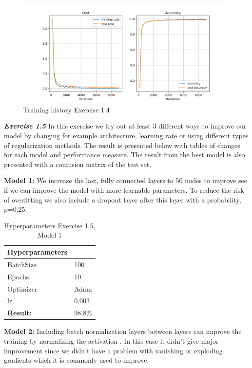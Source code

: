 \documentclass[a4paper,10pt]{article}
\begin{document}
\newpage

\begin{figure}[ht!]
\centering
\includegraphics[width=120mm]{figures/assignment_3/convnet_adam.png}
\caption{Training history Exercise 1.4}
\label{fig:convnetadam}
\end{figure}


\textit{\textbf{Exercise 1.5}} In this exercise we try out at least 3 different ways to improve our model by changing for example architecture, learning rate or using different types of regularization methods. The result is presented below with tables of changes for each model and performance measure. The result from the best model is also presented with a confusion matrix of the test set. 

\textbf{Model 1:} We increase the last, fully connected layers to 50 nodes to improve see if we can improve the model with more learnable parameters. To reduce the risk of overfitting we also include a dropout layer after this layer with a probability, p=0,25. 
\begin{table}[ht!]
\centering
\begin{tabular}{ll}\hline
 \textbf{Hyperparameters}&    \\ \hline
 BatchSize&  100  \\
 Epochs&  10 \\ 
 Optimizer& Adam  \\
 lr& 0.003 \\ \hline
\textbf{Result: }&   98.8\% \\ \hline
\end{tabular}
\caption{Hyperparameters Exercise 1.5, Model 1}
\label{tab:tab7}
\end{table}

\textbf{Model 2:} Including batch normalization layers between layers can improve the training by normalizing the activation \cite{DLbook}. In this case it didn't give major improvement since we didn't have a problem with vanishing or exploding gradients which it is commonly used to improve. 
\end{document}
